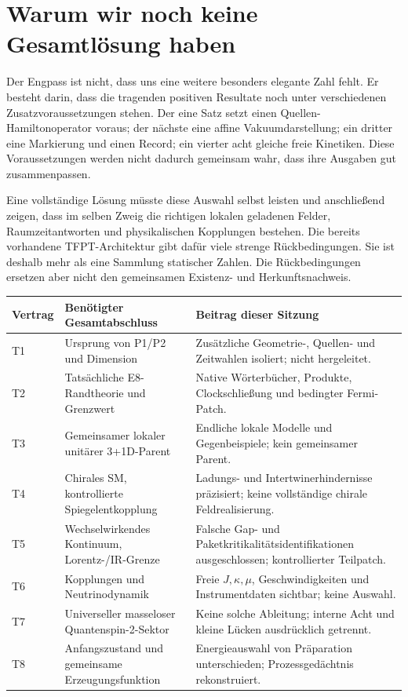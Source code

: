\documentclass[11pt,a4paper,oneside,parskip=half,headings=normal,numbers=noenddot,bibliography=totoc]{scrreprt}
\begin{document}
\section{Warum wir noch keine Gesamtlösung haben}
Der Engpass ist nicht, dass uns eine weitere besonders elegante Zahl fehlt. Er besteht darin, dass die tragenden positiven Resultate noch unter verschiedenen Zusatzvoraussetzungen stehen. Der eine Satz setzt einen Quellen-Hamiltonoperator voraus; der nächste eine affine Vakuumdarstellung; ein dritter eine Markierung und einen Record; ein vierter acht gleiche freie Kinetiken. Diese Voraussetzungen werden nicht dadurch gemeinsam wahr, dass ihre Ausgaben gut zusammenpassen.

Eine vollständige Lösung müsste diese Auswahl selbst leisten und anschließend zeigen, dass im selben Zweig die richtigen lokalen geladenen Felder, Raumzeitantworten und physikalischen Kopplungen bestehen. Die bereits vorhandene TFPT-Architektur gibt dafür viele strenge Rückbedingungen. Sie ist deshalb mehr als eine Sammlung statischer Zahlen. Die Rückbedingungen ersetzen aber nicht den gemeinsamen Existenz- und Herkunftsnachweis.

\noindent\begin{tabularx}{\textwidth}{@{}lYY@{}}
\toprule
Vertrag & Benötigter Gesamtabschluss & Beitrag dieser Sitzung\\\midrule
T1 & Ursprung von P1/P2 und Dimension & Zusätzliche Geometrie-, Quellen- und Zeitwahlen isoliert; nicht hergeleitet.\\
T2 & Tatsächliche E8-Randtheorie und Grenzwert & Native Wörterbücher, Produkte, Clockschließung und bedingter Fermi-Patch.\\
T3 & Gemeinsamer lokaler unitärer 3+1D-Parent & Endliche lokale Modelle und Gegenbeispiele; kein gemeinsamer Parent.\\
T4 & Chirales SM, kontrollierte Spiegelentkopplung & Ladungs- und Intertwinerhindernisse präzisiert; keine vollständige chirale Feldrealisierung.\\
T5 & Wechselwirkendes Kontinuum, Lorentz-/IR-Grenze & Falsche Gap- und Paketkritikalitätsidentifikationen ausgeschlossen; kontrollierter Teilpatch.\\
T6 & Kopplungen und Neutrinodynamik & Freie $J,\kappa,\mu$, Geschwindigkeiten und Instrumentdaten sichtbar; keine Auswahl.\\
T7 & Universeller masseloser Quantenspin-2-Sektor & Keine solche Ableitung; interne Acht und kleine Lücken ausdrücklich getrennt.\\
T8 & Anfangszustand und gemeinsame Erzeugungsfunktion & Energieauswahl von Präparation unterschieden; Prozessgedächtnis rekonstruiert.\\\bottomrule
\end{tabularx}
\end{document}
